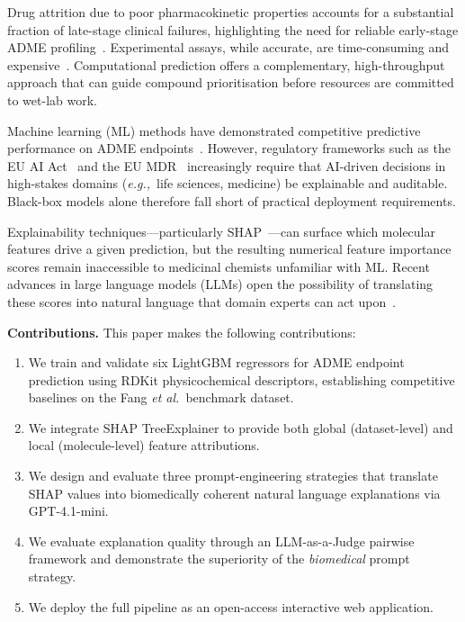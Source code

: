 \documentclass[a4paper, 11pt]{article}
\newcommand{\eg}{\textit{e.g.,}\ }
\newcommand{\etal}{\textit{et al.}\ }
\begin{document}
Drug attrition due to poor pharmacokinetic properties accounts for a
substantial fraction of late-stage clinical failures, highlighting the need
for reliable early-stage ADME profiling~\cite{hughes2011physiochemical}.
Experimental assays, while accurate, are time-consuming and
expensive~\cite{doak2014direct}. Computational prediction offers a
complementary, high-throughput approach that can guide compound
prioritisation before resources are committed to wet-lab work.

Machine learning (ML) methods have demonstrated competitive predictive
performance on ADME endpoints~\cite{fang2023prospective,
konig2024adme}. However, regulatory frameworks such as the EU AI
Act~\cite{euaiact2024} and the EU MDR~\cite{eumdr2017} increasingly require
that AI-driven decisions in high-stakes domains (\eg life sciences,
medicine) be explainable and auditable. Black-box models alone therefore
fall short of practical deployment requirements.

Explainability techniques—particularly SHAP~\cite{lundberg2017unified}—can
surface which molecular features drive a given prediction, but the resulting
numerical feature importance scores remain inaccessible to medicinal
chemists unfamiliar with ML. Recent advances in large language models
(LLMs) open the possibility of translating these scores into natural
language that domain experts can act upon~\cite{kojima2022large,
wei2022chain}.

\medskip
\noindent\textbf{Contributions.} This paper makes the following
contributions:
\begin{enumerate}
  \item We train and validate six LightGBM regressors for ADME endpoint
        prediction using RDKit physicochemical descriptors, establishing
        competitive baselines on the Fang \etal benchmark dataset.
  \item We integrate SHAP TreeExplainer to provide both global
        (dataset-level) and local (molecule-level) feature attributions.
  \item We design and evaluate three prompt-engineering strategies that
        translate SHAP values into biomedically coherent natural language
        explanations via GPT-4.1-mini.
  \item We evaluate explanation quality through an LLM-as-a-Judge
        pairwise framework and demonstrate the superiority of the
        \textit{biomedical} prompt strategy.
  \item We deploy the full pipeline as an open-access interactive web
        application.
\end{enumerate}
\end{document}
